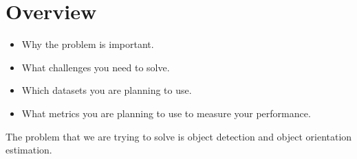 \section{Overview}

    \begin{itemize}
        \item Why the problem is important.
        \item What challenges you need to solve.
        \item Which datasets you are planning to use.
        \item What metrics you are planning to use to measure your performance.
    \end{itemize}

The problem that we are trying to solve is object detection and object orientation estimation. 